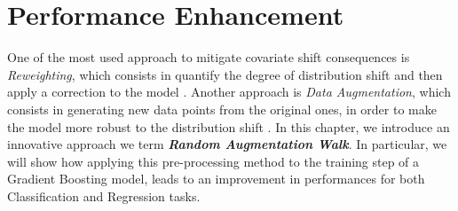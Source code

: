 \chapter{Performance Enhancement}

One of the most used approach to mitigate covariate shift consequences is \textit{Reweighting}, which consists in quantify the degree of distribution shift and then apply a correction to the model \cite{zhang}. Another approach is \textit{Data Augmentation}, which consists in generating new data points from the original ones, in order to make the model more robust to the distribution shift \cite{zhao}. In this chapter, we introduce an innovative approach we term \textbf{\textit{Random Augmentation Walk}}. In particular, we will show how applying this pre-processing method to the training step of a Gradient Boosting model, leads to an improvement in performances for both Classification and Regression tasks.








